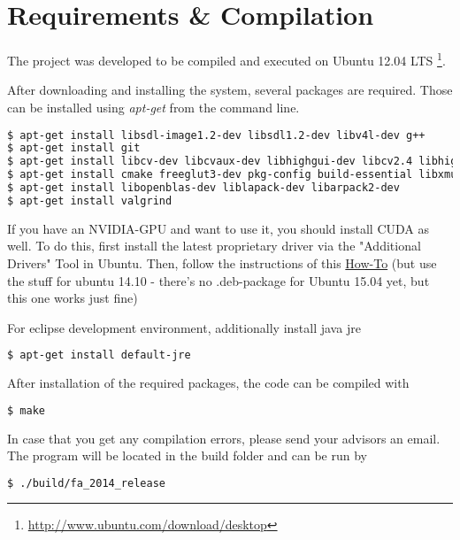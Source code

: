 \section{Requirements \& Compilation}

The project was developed to be compiled and executed on Ubuntu 12.04 LTS
\footnote{\url{http://www.ubuntu.com/download/desktop}}.

After downloading and installing the system, several packages are required.
Those can be installed using \textit{apt-get} from the command line.

\begin{lstlisting}[language=sh]
$ apt-get install libsdl-image1.2-dev libsdl1.2-dev libv4l-dev g++
$ apt-get install git
$ apt-get install libcv-dev libcvaux-dev libhighgui-dev libcv2.4 libhighgui2.4 libcvaux2.4 opencv-doc
$ apt-get install cmake freeglut3-dev pkg-config build-essential libxmu-dev libxi-dev libusb-1.0-0-dev doxygen graphviz mono-complete git-core
$ apt-get install libopenblas-dev liblapack-dev libarpack2-dev
$ apt-get install valgrind
\end{lstlisting}

If you have an NVIDIA-GPU and want to use it, you should install CUDA as well. To do this, 
first install the latest proprietary driver via the "Additional Drivers" Tool in Ubuntu.
Then, follow the instructions of this \href{www.r-tutor.com/gpu-computing/cuda-installation/cuda7.0-ubuntu}{How-To} 
(but use the stuff for ubuntu 14.10 - there's no .deb-package for Ubuntu 15.04 yet,
but this one works just fine)

For eclipse development environment, additionally install java jre
\begin{lstlisting}[language=sh]
$ apt-get install default-jre
\end{lstlisting}

After installation of the required packages, the code can be compiled with

\begin{lstlisting}[language=sh]
$ make
\end{lstlisting}

In case that you get any compilation errors, please send your advisors an
email. The program will be located in the build folder and can be run by

\begin{lstlisting}[language=sh]
$ ./build/fa_2014_release
\end{lstlisting}